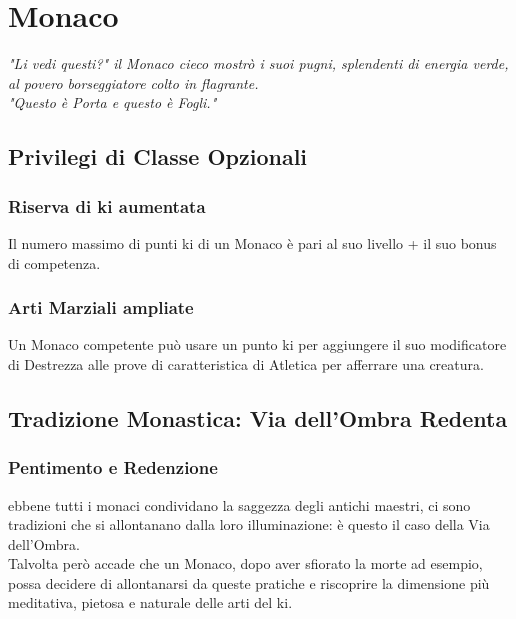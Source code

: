 \chapter{Monaco}

\begin{DndReadAloud}
  \it
  "Li vedi questi?" il Monaco cieco mostrò i suoi pugni, splendenti di energia verde, al povero borseggiatore colto in flagrante. \\ "Questo è Porta e questo è Fogli."
\end{DndReadAloud}

\section{Privilegi di Classe Opzionali}

\subsection{Riserva di ki aumentata}

Il numero massimo di punti ki di un Monaco è pari al suo livello + il suo bonus di competenza.

\subsection{Arti Marziali ampliate}

Un Monaco competente può usare un punto ki per aggiungere il suo modificatore di Destrezza alle prove di caratteristica di Atletica per afferrare una creatura.

\section{Tradizione Monastica: Via dell'Ombra Redenta}

\subsection{Pentimento e Redenzione}

ebbene tutti i monaci condividano la saggezza degli antichi maestri, ci sono tradizioni che si allontanano dalla loro illuminazione: è questo il caso della Via dell'Ombra. \\ Talvolta però accade che un Monaco, dopo aver sfiorato la morte ad esempio, possa decidere di allontanarsi da queste pratiche e riscoprire la dimensione più meditativa, pietosa e naturale delle arti del ki.


